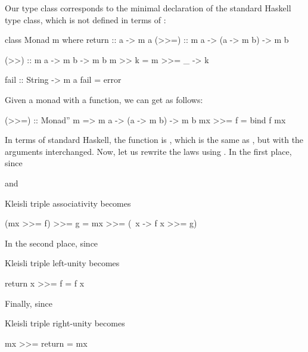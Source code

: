 \begin{remark}
  \label{re:triple-standard}

  Our  type class corresponds to the minimal
  declaration of the standard Haskell  type class,
  which is not defined in terms of :
  \begin{codehaskell}
class Monad m where
  return :: a -> m a
  (>>=)  :: m a -> (a -> m b) -> m b

  (>>)   :: m a -> m b -> m b
  m >> k = m >>= \_ -> k

  fail   :: String -> m a
  fail = error
  \end{codehaskell}
  Given a monad with a  function, we can get
  \texthaskell{(>>=)} as follows:
  \begin{codehaskell}
(>>=) :: Monad'' m => m a -> (a -> m b) -> m b
mx >>= f = bind f mx
  \end{codehaskell}
  In terms of standard Haskell, the  function is
  \texthaskell{(<<=)}, which is the same as \texthaskell{(>>=)}, but
  with the arguments interchanged. Now, let us rewrite the
   laws using \texthaskell{(>>=)}. In the first
  place, since
  \begin{steps}
      \eqbydefh{(>>=)}
      \eqbydefh{(>>=)}
  \end{steps}
  and
  \begin{steps}
      \eqbydefh{(>>=)}
      \eqbydefh{(>>=)}
  \end{steps}
  Kleisli triple associativity becomes
  \begin{codehaskell}
(mx >>= f) >>= g = mx >>= (\ x -> f x >>= g)
  \end{codehaskell}
  In the second place, since
  \begin{steps}
      \eqbydefh{(>>=)}
  \end{steps}
  Kleisli triple left-unity becomes
  \begin{codehaskell}
return x >>= f = f x
  \end{codehaskell}
  Finally, since
  \begin{steps}
      \eqbydefh{(>>=)}
  \end{steps}
  Kleisli triple right-unity becomes
  \begin{codehaskell}
mx >>= return = mx
  \end{codehaskell}


\end{remark}
